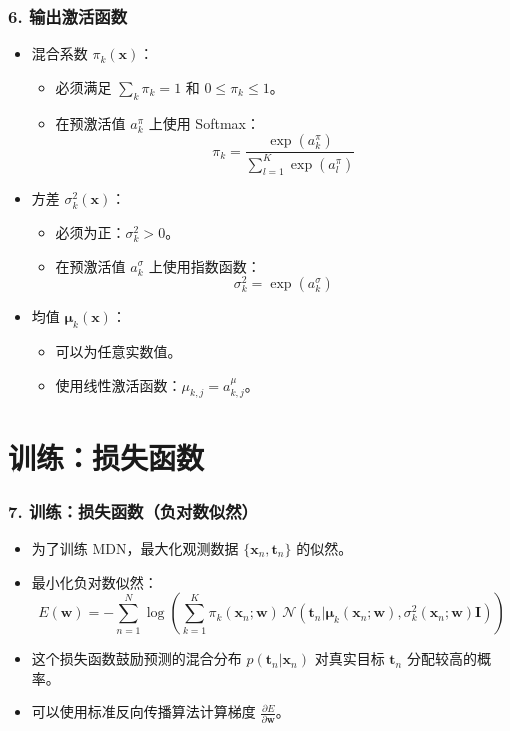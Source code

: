 \documentclass[t,aspectratio=169]{beamer} %
\begin{document}
\begin{frame}
    \frametitle{6. 输出激活函数}
    \begin{itemize}
        \item 混合系数 $ \pi_k(\mathbf{x}) $：
        \begin{itemize}
            \item 必须满足 $ \sum_k \pi_k = 1 $ 和 $ 0 \leq \pi_k \leq 1 $。
            \item 在预激活值 $ a_k^\pi $ 上使用 Softmax：
            \begin{equation*}
                \pi_k = \frac{\exp(a_k^\pi)}{\sum_{l=1}^{K} \exp(a_l^\pi)}
            \end{equation*}
        \end{itemize}
        \item 方差 $ \sigma_k^2(\mathbf{x}) $：
        \begin{itemize}
            \item 必须为正：$ \sigma_k^2 > 0 $。
            \item 在预激活值 $ a_k^\sigma $ 上使用指数函数：
            \begin{equation*}
                \sigma_k^2 = \exp(a_k^\sigma)
            \end{equation*}
        \end{itemize}
        \item 均值 $ \boldsymbol{\mu}_k(\mathbf{x}) $：
        \begin{itemize}
            \item 可以为任意实数值。
            \item 使用线性激活函数：$ \mu_{k,j} = a_{k,j}^\mu $。
        \end{itemize}
    \end{itemize}
\end{frame}

\section{训练：损失函数}
\begin{frame}
    \frametitle{7. 训练：损失函数（负对数似然）}
    \begin{itemize}
        \item 为了训练 MDN，最大化观测数据 $ \{ \mathbf{x}_n, \mathbf{t}_n \} $ 的似然。
        \item 最小化负对数似然：
        \begin{equation*}
            E(\mathbf{w}) = - \sum_{n=1}^{N} \log \left( \sum_{k=1}^{K} \pi_k(\mathbf{x}_n; \mathbf{w}) \, \mathcal{N}(\mathbf{t}_n | \boldsymbol{\mu}_k(\mathbf{x}_n; \mathbf{w}), \sigma_k^2(\mathbf{x}_n; \mathbf{w}) \mathbf{I}) \right)
        \end{equation*}
        \item 这个损失函数鼓励预测的混合分布 $ p(\mathbf{t}_n | \mathbf{x}_n) $ 对真实目标 $ \mathbf{t}_n $ 分配较高的概率。
        \item 可以使用标准反向传播算法计算梯度 $ \frac{\partial E}{\partial \mathbf{w}} $。
    \end{itemize}
\end{frame}
\end{document}
